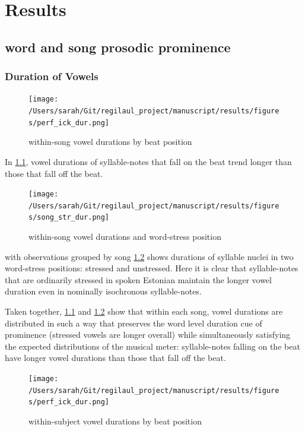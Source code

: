 \chapter{Results}
%


\section{word and song prosodic prominence}


\subsection{Duration of Vowels}


\begin{figure}[htb]
\begin{center}
\texttt{[image: /Users/sarah/Git/regilaul\_project/manuscript/results/figures/perf\_ick\_dur.png]}

\caption{within-song vowel durations by beat position}
\label{songick}
\end{center}
\end{figure}
In \ref{songick}, vowel durations of syllable-notes that fall on the beat trend longer than those that fall off the beat. 
\begin{figure}[htb]
\begin{center}
\texttt{[image: /Users/sarah/Git/regilaul\_project/manuscript/results/figures/song\_str\_dur.png]}

\caption{within-song vowel durations and word-stress position}
\label{songstr}
\end{center}
\end{figure}
with observations grouped by song \ref{songstr} shows durations of syllable nuclei in two word-stress positions: stressed and unstressed. Here it is clear that syllable-notes that are ordinarily stressed in spoken Estonian maintain the longer vowel duration even in nominally isochronous syllable-notes. 

Taken together, \ref{songick} and \ref{songstr} show that within each song, vowel durations are distributed in such a way that preserves the word level duration cue of prominence (stressed vowels are longer overall) while simultaneously satisfying the expected distributions of the musical meter: syllable-notes falling on the beat have longer vowel durations than those that fall off the beat. 

\begin{figure}[htb]
\begin{center}
\texttt{[image: /Users/sarah/Git/regilaul\_project/manuscript/results/figures/perf\_ick\_dur.png]}

\caption{within-subject vowel durations by beat position}
\label{perfick}
\end{center}
\end{figure}


